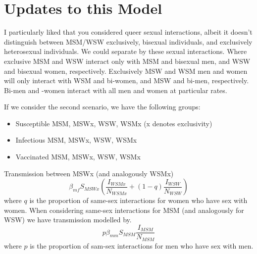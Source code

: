 \documentclass[12pt]{article}
\begin{document}
\section{Updates to this Model}

I particularly liked that you considered queer sexual interactions, albeit it doesn't distinguish between MSM/WSW exclusively, bisexual individuals, and exclusively heterosexual individuals.  We could separate by these sexual interactions.  Where exclusive MSM and WSW interact only with MSM and bisexual men, and WSW and bisexual women, respectively.  Exclusively MSW and WSM men and women will only interact with WSM and bi-women, and MSW and bi-men, respectively. Bi-men and -women interact with all men and women at particular rates.
 

If we consider the second scenario, we have the following groups:
\begin{itemize}
\item Susceptible MSM, MSWx, WSW, WSMx (x denotes exclusivity)
\item Infectious MSM, MSWx, WSW, WSMx
\item Vaccinated MSM, MSWx, WSW, WSMx
\end{itemize}

Transmission between MSWx (and analogously WSMx)
\begin{equation}
\beta_{mf}S_{MSWx}\left(\frac{I_{WSMx}}{N_{WSMx}}+(1-q)\frac{I_{WSW}}{N_{WSW}}\right)
\end{equation}
where $q$ is the proportion of same-sex interactions for women who have sex with women. When considering same-sex interactions for MSM (and analogously for WSW) we have transmission modelled by.
\begin{equation}
p\beta_{mm}S_{MSM}\frac{I_{MSM}}{N_{MSM}}
\end{equation}
where $p$ is the proportion of sam-sex interactions for men who have sex with men.  
\end{document}
